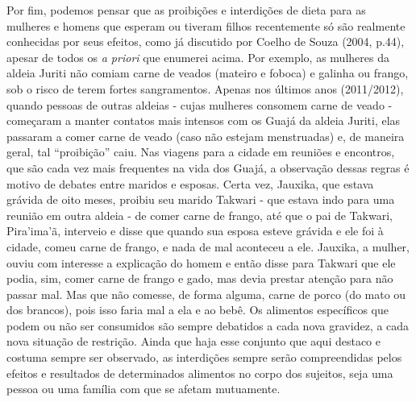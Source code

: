 Por fim, podemos pensar que as proibições e interdições de dieta para as
mulheres e homens que esperam ou tiveram filhos recentemente só são
realmente conhecidas por seus efeitos, como já discutido por Coelho de
Souza (2004, p.44), apesar de todos os \emph{a priori} que enumerei
acima. Por exemplo, as mulheres da aldeia Juriti não comiam carne de
veados (mateiro e foboca) e galinha ou frango, sob o risco de terem
fortes sangramentos. Apenas nos últimos anos (2011/2012), quando pessoas
de outras aldeias - cujas mulheres consomem carne de veado - começaram a
manter contatos mais intensos com os Guajá da aldeia Juriti, elas
passaram a comer carne de veado (caso não estejam menstruadas) e, de
maneira geral, tal ``proibição'' caiu. Nas viagens para a cidade em
reuniões e encontros, que são cada vez mais frequentes na vida dos
Guajá, a observação dessas regras é motivo de debates entre maridos e
esposas. Certa vez, Jauxika, que estava grávida de oito meses, proibiu
seu marido Takwari - que estava indo para uma reunião em outra aldeia -
de comer carne de frango, até que o pai de Takwari, Pira'ima'ã,
interveio e disse que quando sua esposa esteve grávida e ele foi à
cidade, comeu carne de frango, e nada de mal aconteceu a ele. Jauxika, a
mulher, ouviu com interesse a explicação do homem e então disse para
Takwari que ele podia, sim, comer carne de frango e gado, mas devia
prestar atenção para não passar mal. Mas que não comesse, de forma
alguma, carne de porco (do mato ou dos brancos), pois isso faria mal a
ela e ao bebê. Os alimentos específicos que podem ou não ser consumidos
são sempre debatidos a cada nova gravidez, a cada nova situação de
restrição. Ainda que haja esse conjunto que aqui destaco e costuma
sempre ser observado, as interdições sempre serão compreendidas pelos
efeitos e resultados de determinados alimentos no corpo dos sujeitos,
seja uma pessoa ou uma família com que se afetam mutuamente.

